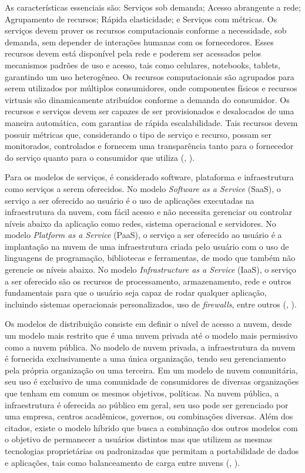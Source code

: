\documentclass[]{politex}
\begin{document}
As características essenciais são: Serviços sob demanda; Acesso abrangente a rede; Agrupamento de recursos; Rápida elasticidade; e Serviços com métricas. Os serviços devem prover os recursos computacionais conforme a necessidade, sob demanda, sem depender de interações humanas com os fornecedores. Esses recursos devem está disponível pela rede e poderem ser acessados pelos mecanismos padrões de uso e acesso, tais como celulares, notebooks, tablets, garantindo um uso heterogêneo. Os recursos computacionais são agrupados para serem utilizados por múltiplos consumidores, onde componentes físicos e recursos virtuais são dinamicamente atribuídos conforme a demanda do consumidor. Os recursos e serviços devem ser capazes de ser provisionados e desalocados de uma maneira automática, com garantias de rápida escalabilidade. Tais recursos devem possuir métricas que, considerando o tipo de serviço e recurso, possam ser monitorados, controlados e  fornecem uma transparência tanto para o fornecedor do serviço quanto para o consumidor que utiliza (, \citeyear{nist}).

Para os modelos de serviços, é considerado software, plataforma e infraestrutura como serviços a serem oferecidos. No modelo \textit{Software as a Service} (SaaS), o serviço a ser oferecido ao usuário é o uso de aplicações executadas na infraestrutura da nuvem, com fácil acesso e não necessita gerenciar ou controlar níveis abaixo da aplicação como redes, sistema operacional e servidores. No modelo \textit{Platform as a Service} (PaaS), o serviço a ser oferecido ao usuário é a implantação na nuvem de uma infraestrutura criada pelo usuário com o uso de linguagens de programação, bibliotecas e ferramentas, de modo que também não gerencie os níveis abaixo. No modelo \textit{Infrastructure as a Service} (IaaS), o serviço a ser oferecido são os recursos de processamento, armazenamento, rede e outros fundamentais para que o usuário seja capaz de rodar qualquer aplicação, incluindo sistemas operacionais personalizados, uso de \textit{firewalls}, entre outros (, \citeyear{nist}).

Os modelos de distribuição consiste em definir o nível de acesso a nuvem, desde um modelo mais restrito que é uma nuvem privada até o modelo mais permissivo como a nuvem pública. No modelo de nuvem privada, a infraestrutura da nuvem é fornecida exclusivamente a uma única organização, tendo seu gerenciamento pela própria organização ou uma terceira. Em um modelo de nuvem comunitária, seu uso é exclusivo de uma comunidade de consumidores de diversas organizações que tenham em comum os mesmos objetivos, políticas. Na nuvem pública, a infraestrutura é oferecida ao público em geral, seu uso pode ser gerenciado por uma empresa, centros acadêmicos, governos, ou combinações diversas. Além dos citados, existe o modelo híbrido que busca a combinação dos outros modelos com o objetivo de permanecer a usuários distintos mas que utilizem as mesmas tecnologias proprietárias ou padronizadas que permitam a portabilidade de dados e aplicações, tais como balanceamento de carga entre nuvens (, \citeyear{nist}).
\end{document}
